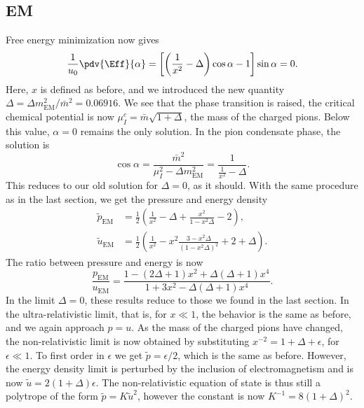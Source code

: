 \documentclass{book}
\begin{document}
\subsection{EM}

Free energy minimization now gives
%
\begin{equation}
    \frac{1}{u_0}\pdv{\Eff}{\alpha}
    = 
    \left[ \left( \frac{1}{x^2} - \Delta \right) \cos \alpha - 1\right] \sin \alpha = 0.
\end{equation}
%
Here, $x$ is defined as before, and we introduced the new quantity $\Delta = \Delta m_{\text{EM}}^2 / \bar m^2= 0.06916$.
We see that the phase transition is raised, the critical chemical potential is now $\mu_I^c = \bar m \sqrt{1 + \Delta}$, the mass of the charged pions.
Below this value, $\alpha = 0$ remains the only solution.
In the pion condensate phase, the solution is
%
\begin{equation}
    \cos \alpha = \frac{\bar m^2}{\mu_I^2 - \Delta m_\text{EM}^2}
    = \frac{1}{\frac{1}{x^2} -  \Delta}.
\end{equation}
%
This reduces to our old solution for $\Delta = 0$, as it should.
With the same procedure as in the last section, we get the pressure and energy density
%
\begin{align}
    \label{pressure with em interaction}
    \tilde p_\text{EM}
    & = \frac{1}{2} 
    \left(
        \frac{1}{x^2} - \Delta
        + \frac{x^2}{1 - x^2 \Delta} 
        - 2 
    \right), \\
    \tilde u_\text{EM}
    &= \frac{1}{2} 
    \left(
        \frac{1}{x^2} 
        - x^2 \frac{3 - x^2 \Delta }{(1 - x^2 \Delta)^2}
        + 2 + \Delta
    \right).
\end{align}
%
The ratio between pressure and energy is now
%
\begin{equation}
    \frac{p_\text{EM}}{u_\text{EM}} 
    = 
    \frac{
        1 - (2\Delta + 1)x^2 + \Delta(\Delta + 1)x^4
        }{
        1 + 3x^2 - \Delta (\Delta +1)x^4
        }.
\end{equation}
%
In the limit $\Delta = 0$, these results reduce to those we found in the last section.
In the ultra-relativistic limit, that is, for  $x \ll 1$, the behavior is the same as before, and we again approach $p = u$.
As the mass of the charged pions have changed, the non-relativistic limit is now obtained by substituting $x^{-2} = 1 + \Delta + \epsilon$, for $\epsilon \ll 1$.
To first order in $\epsilon$ we get $\tilde p = \epsilon / 2$, which is the same as before.
However, the energy density limit is perturbed by the inclusion of electromagnetism and is now $\tilde u = 2(1 + \Delta) \epsilon$.
The non-relativistic equation of state is thus still a polytrope of the form $\tilde p = K \tilde u^2$, however the constant is now $K^{-1} = 8 (1+\Delta)^2$.
\end{document}
